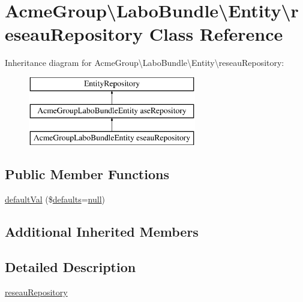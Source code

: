 \hypertarget{class_acme_group_1_1_labo_bundle_1_1_entity_1_1reseau_repository}{\section{Acme\+Group\textbackslash{}Labo\+Bundle\textbackslash{}Entity\textbackslash{}reseau\+Repository Class Reference}
\label{class_acme_group_1_1_labo_bundle_1_1_entity_1_1reseau_repository}
}
Inheritance diagram for Acme\+Group\textbackslash{}Labo\+Bundle\textbackslash{}Entity\textbackslash{}reseau\+Repository\+:\begin{figure}[H]
\begin{center}
\leavevmode
\includegraphics[height=3.000000cm]{class_acme_group_1_1_labo_bundle_1_1_entity_1_1reseau_repository}
\end{center}
\end{figure}
\subsection*{Public Member Functions}
\begin{DoxyCompactItemize}
\item 
\hyperlink{class_acme_group_1_1_labo_bundle_1_1_entity_1_1reseau_repository_a02349ebd16ac0e09c2cef93784c1983f}{default\+Val} (\$\hyperlink{model_8defaults_8js_a9114d742403a54e409eca2e2c78bff56}{defaults}=\hyperlink{validate_8js_afb8e110345c45e74478894341ab6b28e}{null})
\end{DoxyCompactItemize}
\subsection*{Additional Inherited Members}


\subsection{Detailed Description}
\hyperlink{class_acme_group_1_1_labo_bundle_1_1_entity_1_1reseau_repository}{reseau\+Repository}

